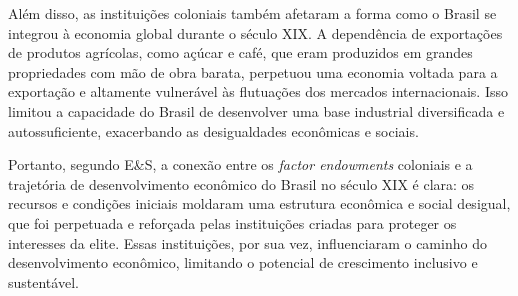 \documentclass[a4paper,12pt]{article}[abntex2]
\begin{document}
Além disso, as instituições coloniais também afetaram a forma como o Brasil se integrou à economia global durante o século XIX. A dependência de exportações de produtos agrícolas, como açúcar e café, que eram produzidos em grandes propriedades com mão de obra barata, perpetuou uma economia voltada para a exportação e altamente vulnerável às flutuações dos mercados internacionais. Isso limitou a capacidade do Brasil de desenvolver uma base industrial diversificada e autossuficiente, exacerbando as desigualdades econômicas e sociais.

Portanto, segundo E\&S, a conexão entre os \textit{factor endowments} coloniais e a trajetória de desenvolvimento econômico do Brasil no século XIX é clara: os recursos e condições iniciais moldaram uma estrutura econômica e social desigual, que foi perpetuada e reforçada pelas instituições criadas para proteger os interesses da elite. Essas instituições, por sua vez, influenciaram o caminho do desenvolvimento econômico, limitando o potencial de crescimento inclusivo e sustentável.
\end{document}
